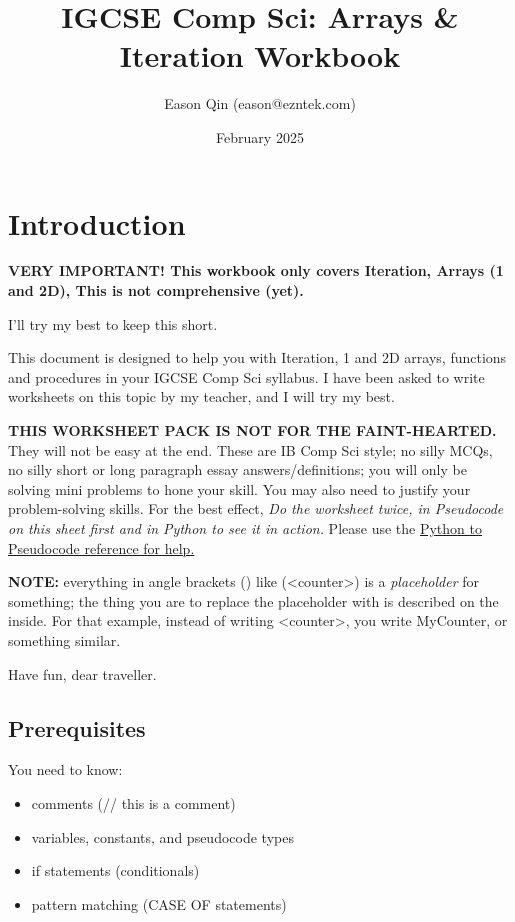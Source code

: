 \documentclass[a4paper, 11pt]{article}
\title{IGCSE Comp Sci: Arrays \& Iteration Workbook}
\author{Eason Qin (eason@ezntek.com)}
\date{February 2025}
\begin{document}
\setlength{\arrayrulewidth}{0.3pt}

\maketitle

\section{Introduction}

{\Large \textbf{VERY IMPORTANT! This workbook only covers Iteration, Arrays (1 and 2D), This is not comprehensive (yet).}}

I'll try my best to keep this short.

This document is designed to help you with Iteration, 1 and 2D arrays, functions and procedures in your IGCSE Comp Sci syllabus. I have been asked to write worksheets on this topic by my teacher, and I will try my best.

\textbf{THIS WORKSHEET PACK IS NOT FOR THE FAINT-HEARTED.} They will not be easy at the end. These are IB Comp Sci style; no silly MCQs, no silly short or long paragraph essay answers/definitions; you will only be solving mini problems to hone your skill. You may also need to justify your problem-solving skills. For the best effect, \emph{Do the worksheet twice, in Pseudocode on this sheet first and in Python to see it in action.} Please use the \href{https://ezntek.com/revision/pseudocode_reference.html}{Python to Pseudocode reference for help.}

\textbf{NOTE:} everything in angle brackets ({\ccmono < >}) like ({\ccmono <counter>}) is a \emph{placeholder} for something; the thing you are to replace the placeholder with is described on the inside. For that example, instead of writing {\ccmono <counter>}, you write {\ccmono MyCounter}, or something similar.

Have fun, dear traveller.

\subsection{Prerequisites}

You need to know:

\begin{itemize}
    \item comments ({\ccmono // this is a comment})
    \item variables, constants, and pseudocode types
    \item if statements (conditionals)
    \item pattern matching ({\ccmono CASE OF} statements)
\end{itemize}
\end{document}
